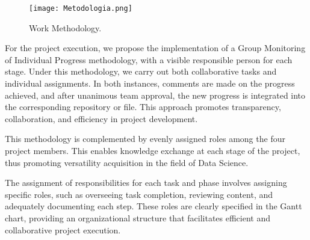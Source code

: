 \documentclass[12pt]{article}
\begin{document}
\begin{figure}[H]
  \centering
  \texttt{[image: Metodologia.png]}
  \caption{Work Methodology.}
  \label{fig:Methodology}
\end{figure}

For the project execution, we propose the implementation of a Group Monitoring of Individual Progress methodology, with a visible responsible person for each stage. Under this methodology, we carry out both collaborative tasks and individual assignments. In both instances, comments are made on the progress achieved, and after unanimous team approval, the new progress is integrated into the corresponding repository or file. This approach promotes transparency, collaboration, and efficiency in project development.

This methodology is complemented by evenly assigned roles among the four project members. This enables knowledge exchange at each stage of the project, thus promoting versatility acquisition in the field of Data Science.

The assignment of responsibilities for each task and phase involves assigning specific roles, such as overseeing task completion, reviewing content, and adequately documenting each step. These roles are clearly specified in the Gantt chart, providing an organizational structure that facilitates efficient and collaborative project execution.
\end{document}
